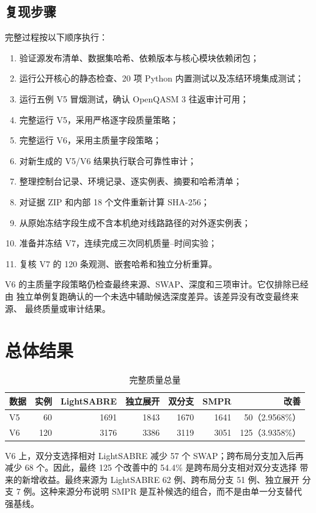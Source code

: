 \documentclass[11pt,a4paper]{article}
\begin{document}
\subsection{复现步骤}

完整过程按以下顺序执行：

\begin{enumerate}
  \item 验证源发布清单、数据集哈希、依赖版本与核心模块依赖闭包；
  \item 运行公开核心的静态检查、20 项 Python 内置测试以及冻结环境集成测试；
  \item 运行五例 V5 冒烟测试，确认 OpenQASM 3 往返审计可用；
  \item 完整运行 V5，采用严格逐字段质量策略；
  \item 完整运行 V6，采用主质量字段策略；
  \item 对新生成的 V5/V6 结果执行联合可靠性审计；
  \item 整理控制台记录、环境记录、逐实例表、摘要和哈希清单；
  \item 对证据 ZIP 和内部 18 个文件重新计算 SHA-256；
  \item 从原始冻结字段生成不含本机绝对线路路径的对外逐实例表；
  \item 准备并冻结 V7，连续完成三次同机质量--时间实验；
  \item 复核 V7 的 120 条观测、嵌套哈希和独立分析重算。
\end{enumerate}

V6 的主质量字段策略仍检查最终来源、SWAP、深度和三项审计。它仅排除已经由
独立单例复跑确认的一个未选中辅助候选深度差异。该差异没有改变最终来源、
最终质量或审计结果。

\section{总体结果}

\begin{table}[H]
\centering
\caption{完整质量总量}
\begin{tabular}{lrrrrrr}
\toprule
数据 & 实例 & LightSABRE & 独立展开 & 双分支 & SMPR & 改善 \\
\midrule
V5 & 60 & 1691 & 1843 & 1670 & 1641 & 50（2.9568\%）\\
V6 & 120 & 3176 & 3386 & 3119 & 3051 & 125（3.9358\%）\\
\bottomrule
\end{tabular}
\end{table}

V6 上，双分支选择相对 LightSABRE 减少 57 个 SWAP；跨布局分支加入后再
减少 68 个。因此，最终 125 个改善中的 54.4\% 是跨布局分支相对双分支选择
带来的新增收益。最终来源为 LightSABRE 62 例、跨布局分支 51 例、独立展开
分支 7 例。这种来源分布说明 SMPR 是互补候选的组合，而不是由单一分支替代
强基线。
\end{document}
